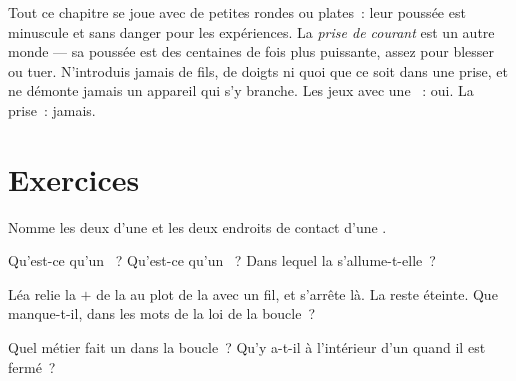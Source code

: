 \begin{remark}\label{rem:g3:first-electric-circuit:safety}
Tout ce chapitre se joue avec de petites  rondes ou plates~:
leur poussée est minuscule et sans danger pour les expériences. La
\emph{prise de courant} est un autre monde --- sa poussée est des
centaines de fois plus puissante, assez pour blesser ou tuer.
N'introduis jamais de fils, de doigts ni quoi que ce soit dans une
prise, et ne démonte jamais un appareil qui s'y branche. Les jeux
avec une ~: oui. La prise~: jamais.
\end{remark}

\section{Exercices}

\begin{exercise}[$\star$]\label{exo:g3:first-electric-circuit:1}
Nomme les deux  d'une  et les deux endroits de contact
d'une .
\end{exercise}

\begin{exercise}[$\star$]\label{exo:g3:first-electric-circuit:2}
Qu'est-ce qu'un ~? Qu'est-ce qu'un ~? Dans
lequel la  s'allume-t-elle~?
\end{exercise}

\begin{exercise}[$\star$]\label{exo:g3:first-electric-circuit:3}
Léa relie la  $+$ de la  au plot de la  avec un fil, et
s'arrête là. La  reste éteinte. Que manque-t-il, dans les mots
de la loi de la boucle~?
\end{exercise}

\begin{exercise}[$\star$]\label{exo:g3:first-electric-circuit:4}
Quel métier fait un  dans la boucle~? Qu'y a-t-il à
l'intérieur d'un  quand il est fermé~?
\end{exercise}

